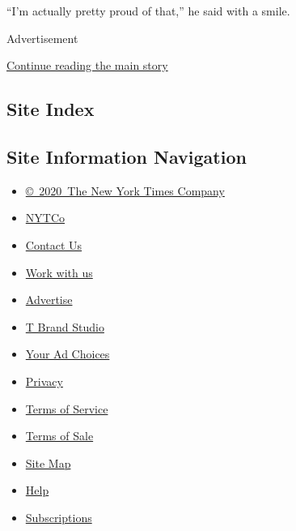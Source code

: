 ``I'm actually pretty proud of that,'' he said with a smile.

Advertisement

\protect\hyperlink{after-bottom}{Continue reading the main story}

\hypertarget{site-index}{%
\subsection{Site Index}\label{site-index}}

\hypertarget{site-information-navigation}{%
\subsection{Site Information
Navigation}\label{site-information-navigation}}

\begin{itemize}
\tightlist
\item
  \href{https://help.nytimes3xbfgragh.onion/hc/en-us/articles/115014792127-Copyright-notice}{©~2020~The
  New York Times Company}
\end{itemize}

\begin{itemize}
\tightlist
\item
  \href{https://www.nytco.com/}{NYTCo}
\item
  \href{https://help.nytimes3xbfgragh.onion/hc/en-us/articles/115015385887-Contact-Us}{Contact
  Us}
\item
  \href{https://www.nytco.com/careers/}{Work with us}
\item
  \href{https://nytmediakit.com/}{Advertise}
\item
  \href{http://www.tbrandstudio.com/}{T Brand Studio}
\item
  \href{https://www.nytimes3xbfgragh.onion/privacy/cookie-policy\#how-do-i-manage-trackers}{Your
  Ad Choices}
\item
  \href{https://www.nytimes3xbfgragh.onion/privacy}{Privacy}
\item
  \href{https://help.nytimes3xbfgragh.onion/hc/en-us/articles/115014893428-Terms-of-service}{Terms
  of Service}
\item
  \href{https://help.nytimes3xbfgragh.onion/hc/en-us/articles/115014893968-Terms-of-sale}{Terms
  of Sale}
\item
  \href{https://spiderbites.nytimes3xbfgragh.onion}{Site Map}
\item
  \href{https://help.nytimes3xbfgragh.onion/hc/en-us}{Help}
\item
  \href{https://www.nytimes3xbfgragh.onion/subscription?campaignId=37WXW}{Subscriptions}
\end{itemize}
